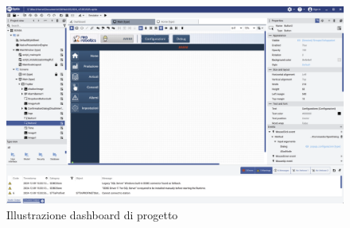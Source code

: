 \begin{figure} [ht]
    \centering
    \includegraphics[width=0.5\linewidth]{Immagini/dashboard.png}
    \caption{Illustrazione dashboard di progetto}
    \label{fig:dashboard.png}
\end{figure}